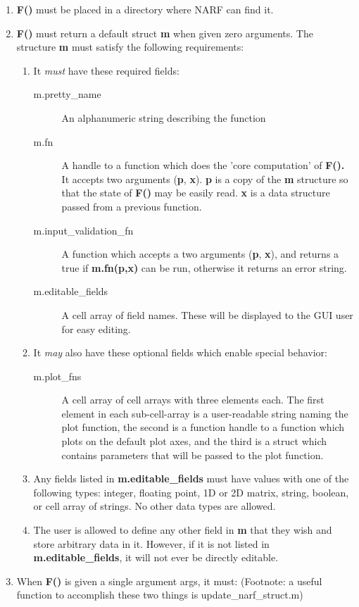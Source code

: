 \documentclass{article}
\begin{document}
\begin{enumerate}
\item \textbf{F()} must be placed in a directory where NARF can find it. 
\item \textbf{F()} must return a default struct \textbf{m}
when given zero arguments. The structure \textbf{m} must satisfy
the following requirements:

\begin{enumerate}
\item It \emph{must }have these required fields:

\begin{description}
\item [{m.pretty\_name}] An alphanumeric string describing the function
\item [{m.fn}] A handle to a function which does the 'core computation'
of \textbf{F(). }It accepts two arguments (\textbf{p}, \textbf{x}).
\textbf{p} is a copy of the \textbf{m} structure so that the
state of\textbf{ F()} may be easily read. \textbf{x} is a data structure
passed from a previous function.
\item [{m.input\_validation\_fn}] A function which accepts a two arguments
(\textbf{p},\textbf{ x}), and returns a true if \textbf{m.fn(p,x)}
can be run, otherwise it returns an error string.
\item [{m.editable\_fields}] A cell array of field names. These will
be displayed to the GUI user for easy editing. 
\end{description}
\item It \emph{may} also have these optional fields which enable special
behavior:

\begin{description}
\item [{m.plot\_fns}] A cell array of cell arrays with three elements
each. The first element in each sub-cell-array is a user-readable
string naming the plot function, the second is a function handle to
a function which plots on the default plot axes, and the third is
a struct which contains parameters that will be passed to the plot
function. 
\end{description}
\item Any fields listed in \textbf{m.editable\_fields} must have values
with one of the following types: integer, floating point, 1D or 2D
matrix, string, boolean, or cell array of strings. No other data types
are allowed.
\item The user is allowed to define any other field in \textbf{m}
that they wish and store arbitrary data in it. However, if it is not
listed in \textbf{m.editable\_fields}, it will not ever be directly
editable.
\end{enumerate}
\item When \textbf{F() }is given a single argument args, it must:
(Footnote: a useful function to accomplish these two things is update\_narf\_struct.m)


\end{enumerate}
\end{document}
